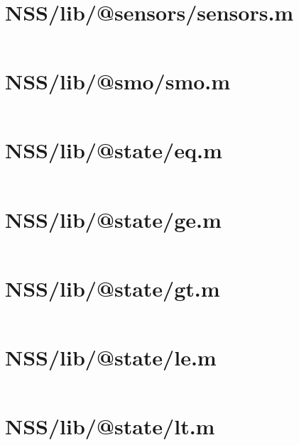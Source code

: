 \pagebreak
\section*{NSS/lib/@sensors/sensors.m}\label{code:NSS/lib/@sensors/sensors.m}
\inputminted[linenos,fontsize=\scriptsize]{matlab}{/home/dcouture/git/mathyourlife/TSatPy/beta_versions/matlab_object_oriented/lib/@sensors/sensors.m}

\pagebreak
\section*{NSS/lib/@smo/smo.m}\label{code:NSS/lib/@smo/smo.m}
\inputminted[linenos,fontsize=\scriptsize]{matlab}{/home/dcouture/git/mathyourlife/TSatPy/beta_versions/matlab_object_oriented/lib/@smo/smo.m}

\pagebreak
\section*{NSS/lib/@state/eq.m}\label{code:NSS/lib/@state/eq.m}
\inputminted[linenos,fontsize=\scriptsize]{matlab}{/home/dcouture/git/mathyourlife/TSatPy/beta_versions/matlab_object_oriented/lib/@state/eq.m}

\pagebreak
\section*{NSS/lib/@state/ge.m}\label{code:NSS/lib/@state/ge.m}
\inputminted[linenos,fontsize=\scriptsize]{matlab}{/home/dcouture/git/mathyourlife/TSatPy/beta_versions/matlab_object_oriented/lib/@state/ge.m}

\pagebreak
\section*{NSS/lib/@state/gt.m}\label{code:NSS/lib/@state/gt.m}
\inputminted[linenos,fontsize=\scriptsize]{matlab}{/home/dcouture/git/mathyourlife/TSatPy/beta_versions/matlab_object_oriented/lib/@state/gt.m}

\pagebreak
\section*{NSS/lib/@state/le.m}\label{code:NSS/lib/@state/le.m}
\inputminted[linenos,fontsize=\scriptsize]{matlab}{/home/dcouture/git/mathyourlife/TSatPy/beta_versions/matlab_object_oriented/lib/@state/le.m}

\pagebreak
\section*{NSS/lib/@state/lt.m}\label{code:NSS/lib/@state/lt.m}
\inputminted[linenos,fontsize=\scriptsize]{matlab}{/home/dcouture/git/mathyourlife/TSatPy/beta_versions/matlab_object_oriented/lib/@state/lt.m}

